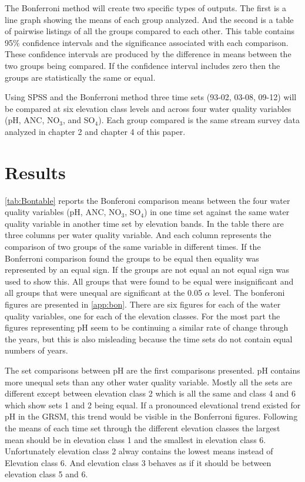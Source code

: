 The Bonferroni method will create two specific types of outputs.
The first is a line graph showing the means of each group analyzed.
And the second is  a table of pairwise listings of all the groups compared to each other.
This table contains 95$\%$ confidence intervals and the significance associated with each comparison.
These confidence intervals are produced by the difference in means between the two groups being compared.
If the confidence interval includes zero then the groups are statistically the same or equal.

Using SPSS and the Bonferroni method three time sets (93-02, 03-08, 09-12) will be compared at six elevation class levels and across four water quality variables (pH, ANC, NO$_3$, and SO$_4 $).
Each group compared is the same stream survey data analyzed in chapter 2 and chapter 4 of this paper.

\section{Results}%

\autoref{tab:Bontable} reports the Bonferoni comparison means between the four water quality variables (pH, ANC, NO$_3$, SO$_4$) in one time set against the same water quality variable in another time set by elevation bands.
In the table there are three columns per water quality variable.
And each column represents the comparison of two groups of the same variable in different times.
If the Bonferroni comparison found the groups to be equal then equality was represented by an equal sign.
If the groups are not equal an not equal sign was used to show this.
All groups that were found to be equal were insignificant and all groups that were unequal are significant at the 0.05 $\alpha$ level.
The bonferoni figures are presented in \autoref{app:bon}.
There are six figures for each of the water quality variables, one for each of the elevation classes.
For the most part the figures representing pH seem to be continuing a similar rate of change through the years, but this is also misleading because the time sets do not contain equal numbers of years.

The set comparisons between pH are the first comparisons presented.  
pH contains more unequal sets than any other water quality variable.
Mostly all the sets are different except between elevation class 2 which is all the same and class 4 and 6 which show sets 1 and 2 being equal.  
If a pronounced elevational trend existed for pH in the GRSM, this trend would be visible in the Bonferroni figures.
Following the means of each time set through the different elevation classes the largest mean should be in elevation class 1 and the smallest in elevation class 6.
Unfortunately elevation class 2 alway contains the lowest means instead of Elevation class 6.
And elevation class 3 behaves as if it should be between elevation class 5 and 6.

